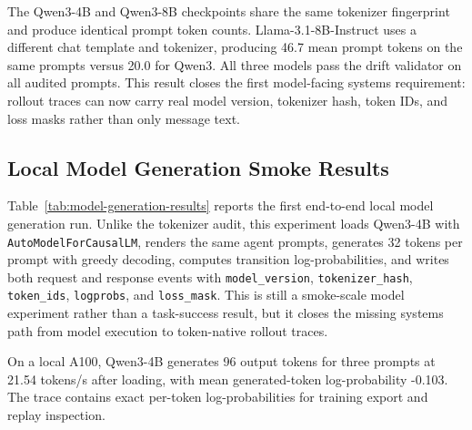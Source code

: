 \documentclass{article}
\begin{document}
The Qwen3-4B and Qwen3-8B checkpoints share the same tokenizer fingerprint and
produce identical prompt token counts. Llama-3.1-8B-Instruct uses a different
chat template and tokenizer, producing 46.7 mean prompt tokens on the same
prompts versus 20.0 for Qwen3. All three models pass the drift validator on all
audited prompts. This result closes the first model-facing systems requirement:
rollout traces can now carry real model version, tokenizer hash, token IDs, and
loss masks rather than only message text.

\begin{table}[t]
\centering
\scriptsize
\resizebox{\linewidth}{!}{%

}
\caption{Tokenizer provenance and token-drift audit using locally cached
open-weight models. Drift Valid counts prompts whose decode/re-encode pass
preserves the recorded token IDs.}
\label{tab:model-provenance-results}
\end{table}

\subsection{Local Model Generation Smoke Results}

Table~\ref{tab:model-generation-results} reports the first end-to-end local
model generation run. Unlike the tokenizer audit, this experiment loads
Qwen3-4B with \texttt{AutoModelForCausalLM}, renders the same agent prompts,
generates 32 tokens per prompt with greedy decoding, computes transition
log-probabilities, and writes both request and response events with
\texttt{model\_version}, \texttt{tokenizer\_hash}, \texttt{token\_ids},
\texttt{logprobs}, and \texttt{loss\_mask}. This is still a smoke-scale model
experiment rather than a task-success result, but it closes the missing systems
path from model execution to token-native rollout traces.

On a local A100, Qwen3-4B generates 96 output tokens for three prompts at 21.54
tokens/s after loading, with mean generated-token log-probability -0.103. The
trace contains exact per-token log-probabilities for training export and replay
inspection.

\begin{table}[t]
\centering
\scriptsize
\resizebox{\linewidth}{!}{%

}
\caption{Local Qwen3-4B generation smoke test with token-native event traces.
Latency excludes model loading; Load s reports local checkpoint load time.}
\label{tab:model-generation-results}
\end{table}
\end{document}
